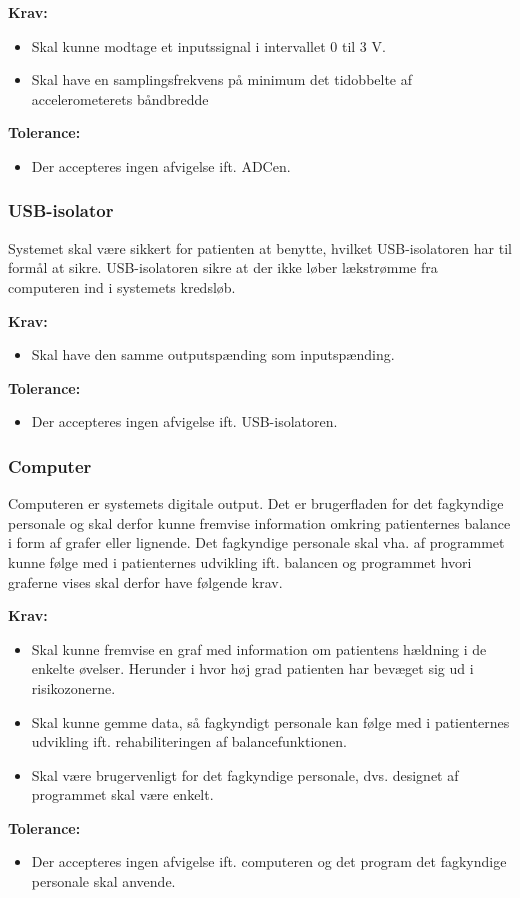 \textbf{Krav:}
\begin{itemize}
\item Skal kunne modtage et inputssignal i intervallet 0 til 3 V.
\item Skal have en samplingsfrekvens på minimum det tidobbelte af accelerometerets båndbredde
\end{itemize}

\textbf{Tolerance:}
\begin{itemize}
\item Der accepteres ingen afvigelse ift. ADCen.
\end{itemize}

\subsubsection{USB-isolator}
Systemet skal være sikkert for patienten at benytte, hvilket USB-isolatoren har til formål at sikre. USB-isolatoren sikre at der ikke løber lækstrømme fra computeren ind i systemets kredsløb.

\textbf{Krav:}
\begin{itemize}
\item Skal have den samme outputspænding som inputspænding. 
\end{itemize}

\textbf{Tolerance:}
\begin{itemize}
\item Der accepteres ingen afvigelse ift. USB-isolatoren. 
\end{itemize}

\subsubsection{Computer}
Computeren er systemets digitale output. Det er brugerfladen for det fagkyndige personale og skal derfor kunne fremvise information omkring patienternes balance i form af grafer eller lignende. Det fagkyndige personale skal vha. af programmet kunne følge med i patienternes udvikling ift. balancen og programmet hvori graferne vises skal derfor have følgende krav.

\textbf{Krav:}
\begin{itemize}
\item Skal kunne fremvise en graf med information om patientens hældning i de enkelte øvelser. Herunder i hvor høj grad patienten har bevæget sig ud i risikozonerne. 
\item Skal kunne gemme data, så fagkyndigt personale kan følge med i patienternes udvikling ift. rehabiliteringen af balancefunktionen.
\item Skal være brugervenligt for det fagkyndige personale, dvs. designet af programmet skal være enkelt. 
\end{itemize}

\textbf{Tolerance:}
\begin{itemize}
\item Der accepteres ingen afvigelse ift. computeren og det program det fagkyndige personale skal anvende. 
\end{itemize}


